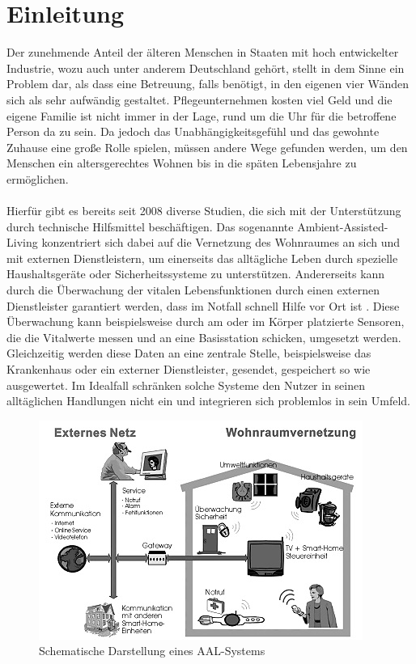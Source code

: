 \section{Einleitung}
Der zunehmende Anteil der älteren Menschen in Staaten mit hoch entwickelter Industrie, wozu auch unter anderem Deutschland gehört, stellt in dem Sinne ein Problem dar, als dass eine Betreuung, falls benötigt, in den eigenen vier Wänden sich als sehr aufwändig gestaltet. Pflegeunternehmen kosten viel Geld und die eigene Familie ist nicht immer in der Lage, rund um die Uhr für die betroffene Person da zu sein. Da jedoch das Unabhängigkeitsgefühl und das gewohnte Zuhause eine große Rolle spielen, müssen andere Wege gefunden werden, um den Menschen ein altersgerechtes Wohnen bis in die späten Lebensjahre zu ermöglichen.
\\
\\
Hierfür gibt es bereits seit 2008 diverse Studien, die sich mit der Unterstützung durch technische Hilfsmittel beschäftigen. Das sogenannte \glqq Ambient-Assisted-Living\grqq \cite{aal} konzentriert sich dabei auf die Vernetzung des Wohnraumes an sich und mit externen Dienstleistern, um einerseits das alltägliche Leben durch spezielle Haushaltsgeräte oder Sicherheitssysteme zu unterstützen. Andererseits kann durch die Überwachung der vitalen Lebensfunktionen durch einen externen Dienstleister garantiert werden, dass im Notfall schnell Hilfe vor Ort ist \cite{aaltm}. Diese Überwachung kann beispielsweise durch am oder im Körper platzierte Sensoren, die die Vitalwerte messen und an eine Basisstation schicken, umgesetzt werden. Gleichzeitig werden diese Daten an eine zentrale Stelle, beispielsweise das Krankenhaus oder ein externer Dienstleister, gesendet, gespeichert so wie ausgewertet. Im Idealfall schränken solche Systeme den Nutzer in seinen alltäglichen Handlungen nicht ein und integrieren sich problemlos in sein Umfeld.

\begin{figure}[h]
\begin{center}
\includegraphics[scale=0.9]{images/intelligente-vernetzung.jpg} 
\caption{Schematische Darstellung eines AAL-Systems}
\end{center}
\end{figure}

